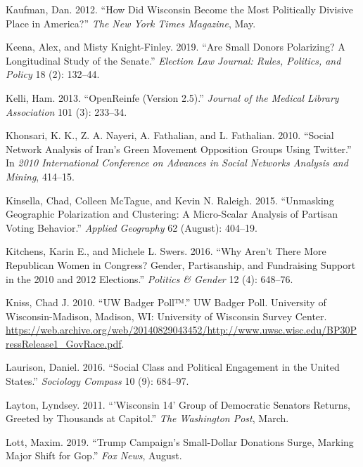 \documentclass[12pt,]{article}
\begin{document}
\leavevmode\hypertarget{ref-kaufman2012}{}%
Kaufman, Dan. 2012. ``How Did Wisconsin Become the Most Politically
Divisive Place in America?'' \emph{The New York Times Magazine}, May.

\leavevmode\hypertarget{ref-keena2019}{}%
Keena, Alex, and Misty Knight-Finley. 2019. ``Are Small Donors
Polarizing? A Longitudinal Study of the Senate.'' \emph{Election Law
Journal: Rules, Politics, and Policy} 18 (2): 132--44.

\leavevmode\hypertarget{ref-openrefine}{}%
Kelli, Ham. 2013. ``OpenReinfe (Version 2.5).'' \emph{Journal of the
Medical Library Association} 101 (3): 233--34.

\leavevmode\hypertarget{ref-khonsari2010}{}%
Khonsari, K. K., Z. A. Nayeri, A. Fathalian, and L. Fathalian. 2010.
``Social Network Analysis of Iran's Green Movement Opposition Groups
Using Twitter.'' In \emph{2010 International Conference on Advances in
Social Networks Analysis and Mining}, 414--15.

\leavevmode\hypertarget{ref-kinsella2015}{}%
Kinsella, Chad, Colleen McTague, and Kevin N. Raleigh. 2015. ``Unmasking
Geographic Polarization and Clustering: A Micro-Scalar Analysis of
Partisan Voting Behavior.'' \emph{Applied Geography} 62 (August):
404--19.

\leavevmode\hypertarget{ref-kitchens2016}{}%
Kitchens, Karin E., and Michele L. Swers. 2016. ``Why Aren't There More
Republican Women in Congress? Gender, Partisanship, and Fundraising
Support in the 2010 and 2012 Elections.'' \emph{Politics \& Gender} 12
(4): 648--76.

\leavevmode\hypertarget{ref-uwsc}{}%
Kniss, Chad J. 2010. ``UW Badger Poll™.'' UW Badger Poll. University of
Wisconsin-Madison, Madison, WI: University of Wisconsin Survey Center.
\url{https://web.archive.org/web/20140829043452/http://www.uwsc.wisc.edu/BP30PressRelease1_GovRace.pdf}.

\leavevmode\hypertarget{ref-laurison2016}{}%
Laurison, Daniel. 2016. ``Social Class and Political Engagement in the
United States.'' \emph{Sociology Compass} 10 (9): 684--97.

\leavevmode\hypertarget{ref-layton2011}{}%
Layton, Lyndsey. 2011. ``'Wisconsin 14' Group of Democratic Senators
Returns, Greeted by Thousands at Capitol.'' \emph{The Washington Post},
March.

\leavevmode\hypertarget{ref-lott2019}{}%
Lott, Maxim. 2019. ``Trump Campaign's Small-Dollar Donations Surge,
Marking Major Shift for Gop.'' \emph{Fox News}, August.
\end{document}
